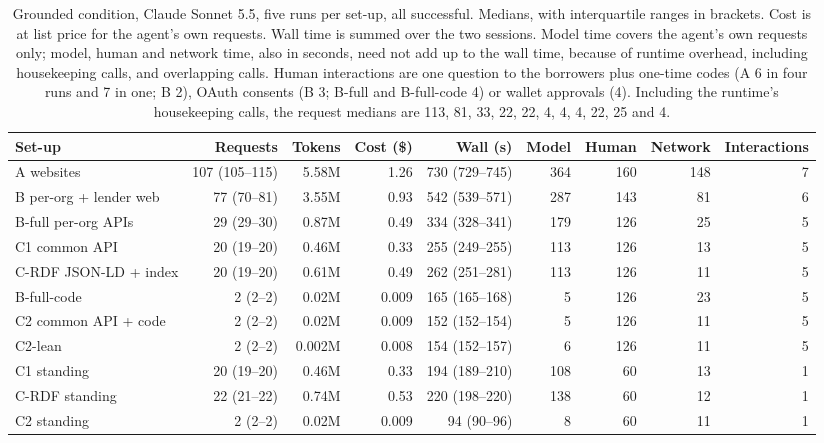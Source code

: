 \documentclass[11pt]{article}
\begin{document}
\begin{table}[t]
\centering
\footnotesize
\setlength{\tabcolsep}{2.6pt}
\begin{tabular}{lrrrrrrrr}
\toprule
Set-up & Requests & Tokens & Cost (\$) & Wall (s) & Model & Human & Network & Interactions \\
\midrule
A websites & 107 (105--115) & 5.58M & 1.26 & 730 (729--745) & 364 & 160 & 148 & 7 \\
B per-org + lender web & 77 (70--81) & 3.55M & 0.93 & 542 (539--571) & 287 & 143 & 81 & 6 \\
B-full per-org APIs & 29 (29--30) & 0.87M & 0.49 & 334 (328--341) & 179 & 126 & 25 & 5 \\
C1 common API & 20 (19--20) & 0.46M & 0.33 & 255 (249--255) & 113 & 126 & 13 & 5 \\
C-RDF JSON-LD + index & 20 (19--20) & 0.61M & 0.49 & 262 (251--281) & 113 & 126 & 11 & 5 \\
B-full-code & 2 (2--2) & 0.02M & 0.009 & 165 (165--168) & 5 & 126 & 23 & 5 \\
C2 common API + code & 2 (2--2) & 0.02M & 0.009 & 152 (152--154) & 5 & 126 & 11 & 5 \\
C2-lean & 2 (2--2) & 0.002M & 0.008 & 154 (152--157) & 6 & 126 & 11 & 5 \\
\midrule
C1 standing & 20 (19--20) & 0.46M & 0.33 & 194 (189--210) & 108 & 60 & 13 & 1 \\
C-RDF standing & 22 (21--22) & 0.74M & 0.53 & 220 (198--220) & 138 & 60 & 12 & 1 \\
C2 standing & 2 (2--2) & 0.02M & 0.009 & 94 (90--96) & 8 & 60 & 11 & 1 \\
\bottomrule
\end{tabular}
\caption{Grounded condition, Claude Sonnet 5.5, five runs per set-up, all successful. Medians, with interquartile ranges in brackets. Cost is at list price for the agent's own requests. Wall time is summed over the two sessions. Model time covers the agent's own requests only; model, human and network time, also in seconds, need not add up to the wall time, because of runtime overhead, including housekeeping calls, and overlapping calls. Human interactions are one question to the borrowers plus one-time codes (A 6 in four runs and 7 in one; B 2), OAuth consents (B 3; B-full and B-full-code 4) or wallet approvals (4). Including the runtime's housekeeping calls, the request medians are 113, 81, 33, 22, 22, 4, 4, 4, 22, 25 and 4.}
\label{tab:grounded}
\end{table}
\end{document}
